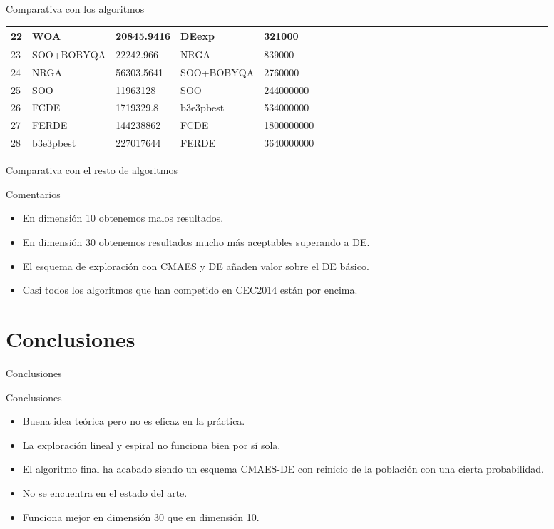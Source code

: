 \documentclass[10pt]{beamer}
\begin{document}
\begin{frame}[fragile]{Comparativa con los algoritmos}
\begin{table}[!h]
{\begin{tabular}{ | l | l | l | l | l | l | l | l | l | l | l | l | l | l | l | l | l | l | l | l | l | l | l | l  |l | l  |l | l | }
					22 & \textbf{WOA} & 20845.9416 & DEexp & 321000 \\ \hline
					23 & SOO+BOBYQA & 22242.966 & NRGA & 839000 \\ \hline
					24 & NRGA & 56303.5641 & SOO+BOBYQA & 2760000 \\ \hline
					25 & SOO & 11963128 & SOO & 244000000 \\ \hline
					26 & FCDE & 1719329.8 & b3e3pbest & 534000000 \\ \hline
					27 & FERDE & 144238862 & FCDE & 1800000000 \\ \hline
					28 & b3e3pbest & 227017644 & FERDE & 3640000000 \\ \hline
				\end{tabular}
			}
			\label{Ranking}
		\end{table}
	\end{frame}

	\begin{frame}[fragile]{Comparativa con el resto de algoritmos}
		\begin{block}{Comentarios}
			\begin{itemize}
				\item En dimensión 10 obtenemos malos resultados.
				\item En dimensión 30 obtenemos resultados mucho más aceptables superando a DE.
				\item El esquema de exploración con CMAES y DE añaden valor sobre el DE básico.
				\item Casi todos los algoritmos que han competido en CEC2014 están por encima.
			\end{itemize}
		\end{block}
	\end{frame}

\section{Conclusiones}

	\begin{frame}[fragile]{Conclusiones}
		\begin{block}{Conclusiones}
			\begin{itemize}
				\item Buena idea teórica pero no es eficaz en la práctica.
				\item La exploración lineal y espiral no funciona bien por sí sola.
				\item El algoritmo final ha acabado siendo un esquema CMAES-DE con reinicio de la población con una cierta probabilidad.
				\item No se encuentra en el estado del arte.
				\item Funciona mejor en dimensión 30 que en dimensión 10.
			\end{itemize}
		\end{block}
	\end{frame}
\end{document}
